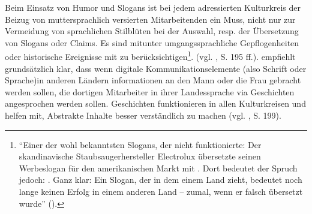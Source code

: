 \documentclass[../../main.tex]{subfiles}
\begin{document}
\begin{sloppypar}
Beim Einsatz von Humor und Slogans ist bei jedem adressierten Kulturkreis der Beizug von muttersprachlich versierten Mitarbeitenden ein Muss, nicht nur zur Vermeidung von sprachlichen Stilblüten bei der Auswahl, resp. der Übersetzung von Slogans oder Claims. Es sind mitunter umgangssprachliche Gepflogenheiten oder historische Ereignisse mit zu berücksichtigen\footnote{"`Einer der wohl bekanntsten Slogans, der nicht funktionierte: Der skandinavische Staubsaugerhersteller Electrolux übersetzte seinen Werbeslogan  für den amerikanischen Markt mit . Dort bedeutet der Spruch jedoch: . Ganz klar: Ein Slogan, der in dem einem Land zieht, bedeutet noch lange keinen Erfolg in einem anderen Land – zumal, wenn er falsch übersetzt wurde"' (\cite{schneider_marken-flops_2011}). }. (vgl. \citeauthor{helisch_security_2009} \citeyear{helisch_security_2009}, S. 195 ff.). \cite{helisch_security_2009} empfiehlt grundsätzlich klar, dass wenn digitale Kommunikationselemente (also Schrift oder Sprache)in anderen Ländern informationen an den Mann oder die Frau gebracht werden sollen, die dortigen Mitarbeiter in ihrer Landessprache via Geschichten angesprochen werden sollen. Geschichten funktionieren in allen Kulturkreisen und helfen mit, Abstrakte Inhalte besser verständlich zu machen (vgl. \citeauthor{helisch_security_2009} \citeyear{helisch_security_2009}, S. 199).
\end{sloppypar}
\end{document}
